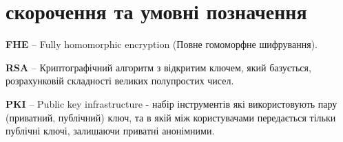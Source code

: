 \newpage
\chapter*{скорочення та умовні позначення}

\textbf{\textsc{FHE}} -- Fully homomorphic encryption (Повне гомоморфне шифрування).

\textbf{\textsc{RSA}} -- Криптографічний алгоритм з відкритим ключем, який базується,
розрахунковій складності великих полупростих чисел.

\textbf{\textsc{PKI}} -- Public key infrastructure - набір інструментів які
використовують пару (приватний, публічний) ключ, та в якій між користувачами
передається тільки публічні ключі, залишаючи приватні анонімними.
